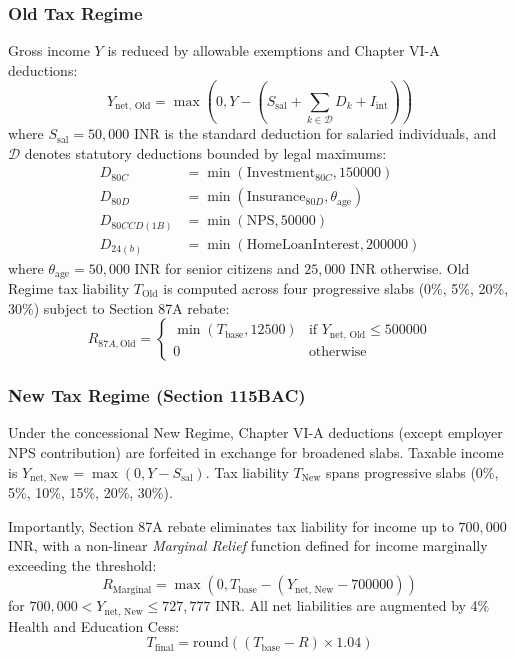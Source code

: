 \documentclass[conference]{IEEEtran}
\begin{document}
\subsubsection{Old Tax Regime}
Gross income $Y$ is reduced by allowable exemptions and Chapter VI-A deductions:
\begin{equation}
Y_{\text{net, Old}} = \max\left(0, Y - \left(S_{\text{sal}} + \sum_{k \in \mathcal{D}} D_k + I_{\text{int}}\right)\right)
\end{equation}
where $S_{\text{sal}} = 50,000$ INR is the standard deduction for salaried individuals, and $\mathcal{D}$ denotes statutory deductions bounded by legal maximums:
\begin{align}
D_{80C} &= \min(\text{Investment}_{80C}, 150000) \\
D_{80D} &= \min(\text{Insurance}_{80D}, \theta_{\text{age}}) \\
D_{80CCD(1B)} &= \min(\text{NPS}, 50000) \\
D_{24(b)} &= \min(\text{HomeLoanInterest}, 200000)
\end{align}
where $\theta_{\text{age}} = 50,000$ INR for senior citizens and $25,000$ INR otherwise. Old Regime tax liability $T_{\text{Old}}$ is computed across four progressive slabs (0\%, 5\%, 20\%, 30\%) subject to Section 87A rebate:
\begin{equation}
R_{87A, \text{Old}} = \begin{cases}
\min(T_{\text{base}}, 12500) & \text{if } Y_{\text{net, Old}} \le 500000 \\
0 & \text{otherwise}
\end{cases}
\end{equation}

\subsubsection{New Tax Regime (Section 115BAC)}
Under the concessional New Regime, Chapter VI-A deductions (except employer NPS contribution) are forfeited in exchange for broadened slabs. Taxable income is $Y_{\text{net, New}} = \max(0, Y - S_{\text{sal}})$. Tax liability $T_{\text{New}}$ spans progressive slabs (0\%, 5\%, 10\%, 15\%, 20\%, 30\%). 

Importantly, Section 87A rebate eliminates tax liability for income up to $700,000$ INR, with a non-linear \textit{Marginal Relief} function defined for income marginally exceeding the threshold:
\begin{equation}
R_{\text{Marginal}} = \max\left(0, T_{\text{base}} - (Y_{\text{net, New}} - 700000)\right)
\end{equation}
for $700,000 < Y_{\text{net, New}} \le 727,777$ INR. All net liabilities are augmented by 4\% Health and Education Cess:
\begin{equation}
T_{\text{final}} = \text{round}\left((T_{\text{base}} - R) \times 1.04\right)
\end{equation}
\end{document}
